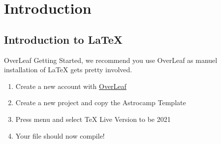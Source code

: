 \section{Introduction}
\subsection{Introduction to LaTeX}

\begin{frame}{OverLeaf}
Getting Started, we recommend you use OverLeaf as manuel installation of LaTeX gets pretty involved.
\begin{enumerate}
    \item Create a new account with \href{https://www.overleaf.com/}{OverLeaf}
    \item Create a new project and copy the Astrocamp Template
    \item Press menu and select TeX Live Version to be 2021
    \item Your file should now compile!
\end{enumerate}
\end{frame}

